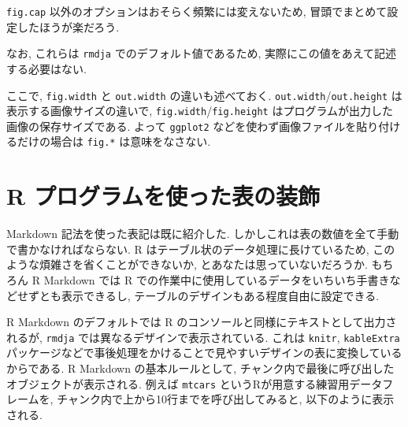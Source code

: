 \documentclass[
  xelatex,ja=standard,jafont=noto]{bxjsbook}
\newenvironment{Shaded}{\begin{snugshade}}{\end{snugshade}}
\newcommand{\AttributeTok}[1]{\textcolor[rgb]{0.77,0.63,0.00}{#1}}
\newcommand{\FloatTok}[1]{\textcolor[rgb]{0.00,0.00,0.81}{#1}}
\newcommand{\FunctionTok}[1]{\textcolor[rgb]{0.00,0.00,0.00}{#1}}
\newcommand{\NormalTok}[1]{#1}
\newcommand{\SpecialCharTok}[1]{\textcolor[rgb]{0.00,0.00,0.00}{#1}}
\newcommand{\StringTok}[1]{\textcolor[rgb]{0.31,0.60,0.02}{#1}}
\theoremstyle{definition}
\theoremstyle{definition}
\theoremstyle{definition}
\theoremstyle{definition}
\theoremstyle{remark}
\begin{document}
\texttt{fig.cap} 以外のオプションはおそらく頻繁には変えないため,
冒頭でまとめて設定したほうが楽だろう.

\begin{Shaded}
\end{Shaded}

なお, これらは \texttt{rmdja} でのデフォルト値であるため,
実際にこの値をあえて記述する必要はない.

ここで, \texttt{fig.width} と \texttt{out.width} の違いも述べておく.
\texttt{out.width}/\texttt{out.height} は表示する画像サイズの違いで,
\texttt{fig.width}/\texttt{fig.height}
はプログラムが出力した画像の保存サイズである. よって \texttt{ggplot2}
などを使わず画像ファイルを貼り付けるだけの場合は \texttt{fig.*}
は意味をなさない.

\hypertarget{r-ux30d7ux30edux30b0ux30e9ux30e0ux3092ux4f7fux3063ux305fux8868ux306eux88c5ux98fe}{%
\section{R
プログラムを使った表の装飾}\label{r-ux30d7ux30edux30b0ux30e9ux30e0ux3092ux4f7fux3063ux305fux8868ux306eux88c5ux98fe}}

Markdown 記法を使った表記は既に紹介した.
しかしこれは表の数値を全て手動で書かなければならない. R
はテーブル状のデータ処理に長けているため,
このような煩雑さを省くことができないか, とあなたは思っていないだろうか.
もちろん R Markdown では R
での作業中に使用しているデータをいちいち手書きなどせずとも表示できるし,
テーブルのデザインもある程度自由に設定できる.

R Markdown のデフォルトでは R
のコンソールと同様にテキストとして出力されるが, \texttt{rmdja}
では異なるデザインで表示されている. これは \texttt{knitr},
\texttt{kableExtra}
パッケージなどで事後処理をかけることで見やすいデザインの表に変換しているからである.
R Markdown の基本ルールとして,
チャンク内で最後に呼び出したオブジェクトが表示される. 例えば
\texttt{mtcars} というRが用意する練習用データフレームを,
チャンク内で上から10行までを呼び出してみると, 以下のように表示される.
\end{document}
